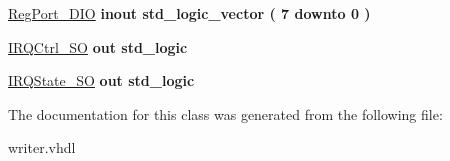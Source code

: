 \begin{DoxyCompactItemize}
\item 
\mbox{\label{classwriter_a1f43ab6af4ed4997c825beeecb67c6f0}} 
\hyperlink{classwriter_a1f43ab6af4ed4997c825beeecb67c6f0}{Reg\+Port\+\_\+\+D\+IO}  {\bfseries {\bfseries \textcolor{vhdlchar}{inout}\textcolor{vhdlchar}{ }}} {\bfseries \textcolor{vhdlchar}{std\+\_\+logic\+\_\+vector}\textcolor{vhdlchar}{ }\textcolor{vhdlchar}{(}\textcolor{vhdlchar}{ }\textcolor{vhdlchar}{ } \textcolor{vhdldigit}{7} \textcolor{vhdlchar}{ }\textcolor{vhdlchar}{downto}\textcolor{vhdlchar}{ }\textcolor{vhdlchar}{ } \textcolor{vhdldigit}{0} \textcolor{vhdlchar}{ }\textcolor{vhdlchar}{)}\textcolor{vhdlchar}{ }} 
\item 
\mbox{\label{classwriter_a33c132776119892469f53f02d193b0e8}} 
\hyperlink{classwriter_a33c132776119892469f53f02d193b0e8}{I\+R\+Q\+Ctrl\+\_\+\+SO}  {\bfseries {\bfseries \textcolor{vhdlchar}{out}\textcolor{vhdlchar}{ }}} {\bfseries \textcolor{vhdlchar}{std\+\_\+logic}\textcolor{vhdlchar}{ }} 
\item 
\mbox{\label{classwriter_a088e58e610bbc1ffae13fde6efdf06dc}} 
\hyperlink{classwriter_a088e58e610bbc1ffae13fde6efdf06dc}{I\+R\+Q\+State\+\_\+\+SO}  {\bfseries {\bfseries \textcolor{vhdlchar}{out}\textcolor{vhdlchar}{ }}} {\bfseries \textcolor{vhdlchar}{std\+\_\+logic}\textcolor{vhdlchar}{ }} 
\end{DoxyCompactItemize}


The documentation for this class was generated from the following file\+:\begin{DoxyCompactItemize}
\item 
writer.\+vhdl\end{DoxyCompactItemize}
